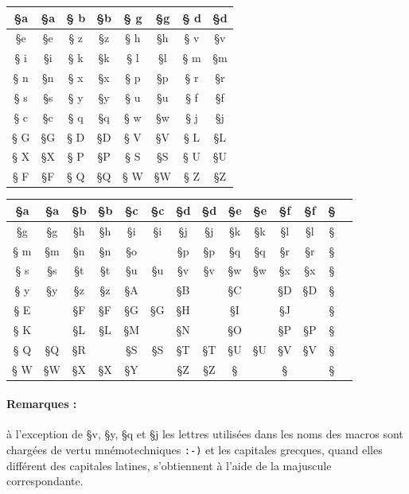 \documentclass[full, french]{l3doc}
\begin{document}
\begin{center}\Large
\begin{ParesseActive} \label{codageorig}
\begin{tabular}{*4{||>{\ttfamily \S}c|c}||}\hline
a & §a & b & §b & g & §g & d & §d\\ \hline
e & §e & z & §z & h & §h & v & §v\\ \hline
i & §i & k & §k & l & §l & m & §m\\ \hline
n & §n & x & §x & p & §p & r & §r\\ \hline
s & §s & y & §y & u & §u & f & §f\\ \hline
c & §c & q & §q & w & §w & j & §j\\ \hline\hline
G & §G & D & §D & V & §V & L & §L\\ \hline
X & §X & P & §P & S & §S & U & §U\\ \hline
F & §F & Q & §Q & W & §W & Z & §Z\\ \hline
\end{tabular}
\end{ParesseActive}
\end{center}

\vspace{2\baselineskip}

\begin{center}\Large
\begin{ParesseActive} \label{codageorig}
\begin{tabular}{*7{||>{\ttfamily \S}c|c}||}\hline
a&§a&b&§b&c&§c&d&§d&e&§e&f&§f\\ \hline
g&§g&h&§h&i&§i&j&§j&k&§k&l&§l\\ \hline
m&§m&n&§n&o&  &p&§p&q&§q&r&§r\\ \hline
s&§s&t&§t&u&§u&v&§v&w&§w&x&§x\\ \hline
y&§y&z&§z&A&  &B&  &C&  &D&§D\\ \hline
E&  &F&§F&G&§G&H&  &I&  &J&  \\ \hline
K&  &L&§L&M&  &N&  &O&  &P&§P\\ \hline
Q&§Q&R&  &S&§S&T&§T&U&§U&V&§V\\ \hline
W&§W&X&§X&Y&  &Z&§Z&\\ \hline
\end{tabular}
\end{ParesseActive}
\end{center}

\paragraph{Remarques : } à l'exception de {\ActiveLaParesse §v, §y, §q et §j}
les lettres utilisées dans les noms des macros sont chargées de vertu
mnémotechniques \texttt{:-)} et les capitales grecques, quand elles différent
des capitales latines, s'obtiennent à l'aide de la majuscule correspondante.
\end{document}
